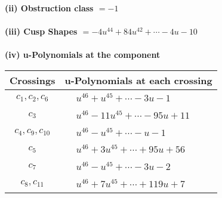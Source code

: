\documentclass[1p]{elsarticle_modified}
\theoremstyle{definition}
\begin{document}
\flushleft \textbf{(ii) Obstruction class $= -1$}\\~\\
\flushleft \textbf{(iii) Cusp Shapes $= -4 u^{44}+84 u^{42}+\cdots-4 u-10$}\\~\\
\newpage\renewcommand{\arraystretch}{1}
\flushleft \textbf{(iv) u-Polynomials at the component}\newline \\
\begin{tabular}{m{50pt}|m{274pt}}
Crossings & \hspace{64pt}u-Polynomials at each crossing \\
\hline $$\begin{aligned}c_{1},c_{2},c_{6}\end{aligned}$$&$\begin{aligned}
&u^{46}+u^{45}+\cdots-3 u-1
\end{aligned}$\\
\hline $$\begin{aligned}c_{3}\end{aligned}$$&$\begin{aligned}
&u^{46}-11 u^{45}+\cdots-95 u+11
\end{aligned}$\\
\hline $$\begin{aligned}c_{4},c_{9},c_{10}\end{aligned}$$&$\begin{aligned}
&u^{46}- u^{45}+\cdots- u-1
\end{aligned}$\\
\hline $$\begin{aligned}c_{5}\end{aligned}$$&$\begin{aligned}
&u^{46}+3 u^{45}+\cdots+95 u+56
\end{aligned}$\\
\hline $$\begin{aligned}c_{7}\end{aligned}$$&$\begin{aligned}
&u^{46}- u^{45}+\cdots-3 u-2
\end{aligned}$\\
\hline $$\begin{aligned}c_{8},c_{11}\end{aligned}$$&$\begin{aligned}
&u^{46}+7 u^{45}+\cdots+119 u+7
\end{aligned}$\\
\hline
\end{tabular}\\~\\
\end{document}

